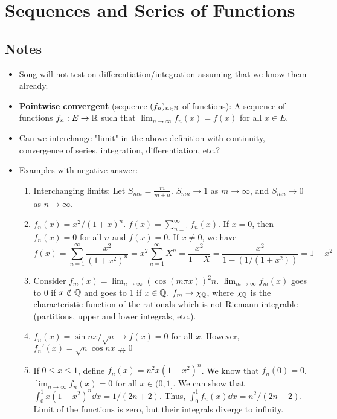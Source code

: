\documentclass[../../notes.tex]{subfiles}
\begin{document}
\chapter{Sequences and Series of Functions}
\section{Notes}
\begin{itemize}
    \item {}Soug will not test on differentiation/integration assuming that we know them already.
    \item \textbf{Pointwise convergent} (sequence $(f_n)_{n\in\mathbb{N}}$ of functions): A sequence of functions $f_n:E\to\mathbb{R}$ such that $\lim_{n\to\infty}f_n(x)=f(x)$ for all $x\in E$.
    \item Can we interchange "limit" in the above definition with continuity, convergence of series, integration, differentiation, etc.?
    \item Examples with negative answer:
    \begin{enumerate}
        \item Interchanging limits: Let $S_{mn}=\frac{m}{m+n}$. $S_{mn}\to 1$ as $m\to\infty$, and $S_{mn}\to 0$ as $n\to\infty$.
        \item $f_n(x)=x^2/(1+x)^n$. $f(x)=\sum_{n=1}^\infty f_n(x)$. If $x=0$, then $f_n(x)=0$ for all $n$ and $f(x)=0$. If $x\neq 0$, we have
        \begin{equation*}
            f(x) = \sum_{n=1}^\infty\frac{x^2}{(1+x^2)^n} = x^2\sum_{n=1}^\infty X^n = \frac{x^2}{1-X} = \frac{x^2}{1-(1/(1+x^2))} = 1+x^2
        \end{equation*}
        \item Consider $f_m(x)=\lim_{n\to\infty}(\cos(m\pi x))^2n$. $\lim_{m\to\infty}f_m(x)$ goes to 0 if $x\notin\mathbb{Q}$ and goes to 1 if $x\in\mathbb{Q}$. $f_m\to\chi_{\mathbb{Q}}$, where $\chi_{\mathbb{Q}}$ is the characteristic function of the rationals which is not Riemann integrable (partitions, upper and lower integrals, etc.).
        \item $f_n(x)=\sin nx/\sqrt{n}\to f(x)=0$ for all $x$. However, $f_n'(x)=\sqrt{n}\cos nx\nrightarrow 0$
        \item If $0\leq x\leq 1$, define $f_n(x)=n^2x(1-x^2)^n$. We know that $f_n(0)=0$. $\lim_{n\to\infty}f_n(x)=0$ for all $x\in(0,1]$. We can show that $\int_0^1x(1-x^2)^n\dd{x}=1/(2n+2)$. Thus, $\int_0^1f_n(x)\dd{x}=n^2/(2n+2)$. Limit of the functions is zero, but their integrals diverge to infinity.
    \end{enumerate}

\end{itemize}
\end{document}

